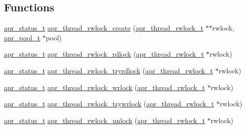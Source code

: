 \subsection*{Functions}
\begin{DoxyCompactItemize}
\item 
\hyperlink{group__apr__errno_gaf76ee4543247e9fb3f3546203e590a6c}{apr\-\_\-status\-\_\-t} \hyperlink{group__apr__thread__rwlock_gadae9c87ad957112406b48947cb1f0e93}{apr\-\_\-thread\-\_\-rwlock\-\_\-create} (\hyperlink{group__apr__thread__rwlock_gaede9b908e3d9e6a8aed7bd10d0ae0498}{apr\-\_\-thread\-\_\-rwlock\-\_\-t} $\ast$$\ast$rwlock, \hyperlink{group__apr__pools_gaf137f28edcf9a086cd6bc36c20d7cdfb}{apr\-\_\-pool\-\_\-t} $\ast$pool)
\item 
\hyperlink{group__apr__errno_gaf76ee4543247e9fb3f3546203e590a6c}{apr\-\_\-status\-\_\-t} \hyperlink{group__apr__thread__rwlock_gad44a106cd9a81eef362d31837ca7018f}{apr\-\_\-thread\-\_\-rwlock\-\_\-rdlock} (\hyperlink{group__apr__thread__rwlock_gaede9b908e3d9e6a8aed7bd10d0ae0498}{apr\-\_\-thread\-\_\-rwlock\-\_\-t} $\ast$rwlock)
\item 
\hyperlink{group__apr__errno_gaf76ee4543247e9fb3f3546203e590a6c}{apr\-\_\-status\-\_\-t} \hyperlink{group__apr__thread__rwlock_ga2bbbc137f5c610e31bf87fd0a60c428e}{apr\-\_\-thread\-\_\-rwlock\-\_\-tryrdlock} (\hyperlink{group__apr__thread__rwlock_gaede9b908e3d9e6a8aed7bd10d0ae0498}{apr\-\_\-thread\-\_\-rwlock\-\_\-t} $\ast$rwlock)
\item 
\hyperlink{group__apr__errno_gaf76ee4543247e9fb3f3546203e590a6c}{apr\-\_\-status\-\_\-t} \hyperlink{group__apr__thread__rwlock_ga91543c9f97a6a1265524a5a8f55fef31}{apr\-\_\-thread\-\_\-rwlock\-\_\-wrlock} (\hyperlink{group__apr__thread__rwlock_gaede9b908e3d9e6a8aed7bd10d0ae0498}{apr\-\_\-thread\-\_\-rwlock\-\_\-t} $\ast$rwlock)
\item 
\hyperlink{group__apr__errno_gaf76ee4543247e9fb3f3546203e590a6c}{apr\-\_\-status\-\_\-t} \hyperlink{group__apr__thread__rwlock_ga54c04596f8a1f44630bdda5a25578d63}{apr\-\_\-thread\-\_\-rwlock\-\_\-trywrlock} (\hyperlink{group__apr__thread__rwlock_gaede9b908e3d9e6a8aed7bd10d0ae0498}{apr\-\_\-thread\-\_\-rwlock\-\_\-t} $\ast$rwlock)
\item 
\hyperlink{group__apr__errno_gaf76ee4543247e9fb3f3546203e590a6c}{apr\-\_\-status\-\_\-t} \hyperlink{group__apr__thread__rwlock_gac7b31112d972abfcac30252e622eb040}{apr\-\_\-thread\-\_\-rwlock\-\_\-unlock} (\hyperlink{group__apr__thread__rwlock_gaede9b908e3d9e6a8aed7bd10d0ae0498}{apr\-\_\-thread\-\_\-rwlock\-\_\-t} $\ast$rwlock)
$$
\end{DoxyCompactItemize}
